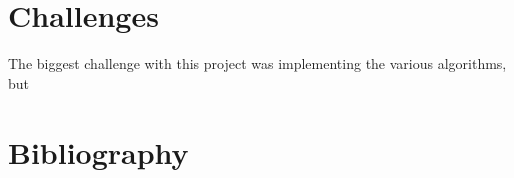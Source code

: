 \documentclass[a4paper,10pt]{article}
\begin{document}
\begin{equation}
\end{equation}




\section{Challenges}
The biggest challenge with this project was implementing the various 
algorithms, but 

\pagebreak
\section{Bibliography}


\end{document}
